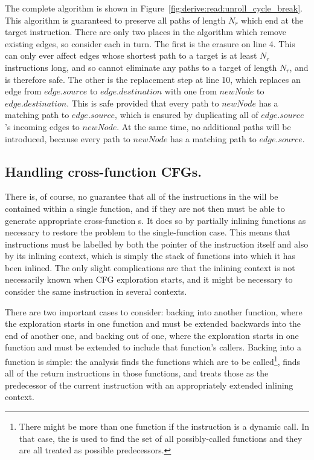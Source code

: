 The complete algorithm is shown in
Figure~\ref{fig:derive:read:unroll_cycle_break}.  This algorithm is
guaranteed to preserve all paths of length $N_r$ which end at the
target instruction.  There are only two places in the algorithm which
remove existing edges, so consider each in turn.  The first is the
erasure on line 4.  This can only ever affect edges whose shortest
path to a target is at least $N_r$ instructions long, and so cannot
eliminate any paths to a target of length $N_r$, and is therefore
safe.  The other is the replacement step at line 10, which replaces an
edge from $edge.source$ to $edge.destination$ with one from $newNode$
to $edge.destination$.  This is safe provided that every path to
$newNode$ has a matching path to $edge.source$, which is ensured by
duplicating all of $edge.source$'s incoming edges to $newNode$.  At
the same time, no additional paths will be introduced, because every
path to $newNode$ has a matching path to $edge.source$.


\subsection{Handling cross-function CFGs.}

There is, of course, no guarantee that all of the instructions in the
 will be contained within a single function,
and if they are not then {\technique} must be able to generate
appropriate cross-function s.  It does so by partially
inlining functions as necessary to restore the problem to the
single-function case.  This means that instructions must be labelled
by both the pointer of the instruction itself and also by its inlining
context, which is simply the stack of functions into which it has been
inlined.  The only slight complications
are that the inlining context is not necessarily known when CFG
exploration starts, and it might be necessary to consider the same
instruction in several contexts.


There are two important cases to consider: backing into another
function, where the exploration starts in one function and must be
extended backwards into the end of another one, and backing out of
one, where the exploration starts in one function and must be extended
to include that function's callers.  Backing into a function is
simple: the analysis finds the functions which are to be
called\footnote{There might be more than one function if the
  instruction is a dynamic call.  In that case, the  is used to find the set of all possibly-called functions
  and they are all treated as possible predecessors.}, finds all of
the return instructions in those functions, and treats those as the
predecessor of the current instruction with an appropriately extended
inlining context.

